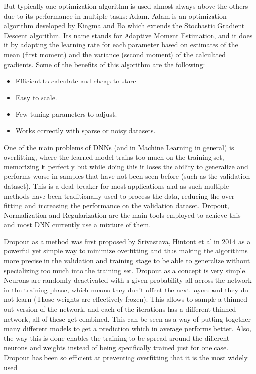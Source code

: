 But typically one optimization algorithm is used almost always above the others due to its performance in multiple tasks: Adam. Adam is an optimization algorithm developed by Kingma and Ba\cite{DBLP:journals/corr/KingmaB14} which extends the Stochastic Gradient Descent algorithm. Its name stands for Adaptive Moment Estimation, and it does it by adapting the learning rate for each parameter based on estimates of the mean (first moment) and the variance (second moment) of the calculated gradients. Some of the benefits of this algorithm are the following:

\begin{itemize}
	\item Efficient to calculate and cheap to store.
	\item Easy to scale.
	\item Few tuning parameters to adjust.
	\item Works correctly with sparse or noisy datasets.
\end{itemize}


One of the main problems of DNNs (and in Machine Learning in general) is overfitting, where the learned model trains too much on the training set, memorizing it perfectly but while doing this it loses the ability to generalize and performs worse in samples that have not been seen before (such as the validation dataset). This is a deal-breaker for most applications and as such multiple methods have been traditionally used to process the data, reducing the over-fitting and increasing the performance on the validation dataset. Dropout, Normalization and Regularization are the main tools employed to achieve this and most DNN currently use a mixture of them.

Dropout as a method was first proposed by Srivastava, Hintont et al\cite{JMLR:v15:srivastava14a} in 2014 as  a powerful yet simple way to minimize overfitting and thus making the algorithms more precise in the validation and training stage to be able to generalize without specializing too much into the training set. Dropout as a concept is very simple. Neurons are randomly deactivated with a given probability all across the network in the training phase, which means they don’t affect the next layers and they do not learn (Those weights are effectively frozen). This allows to sample a thinned out version of the network, and each of the iterations has a different thinned network, all of these get combined. This can be seen as a way of putting together many different models to get a prediction which in average performs better. Also, the way this is done enables the training to be spread around the different neurons and weights instead of being specifically trained just for one case. Dropout has been so efficient at preventing overfitting that it is the most widely used 


